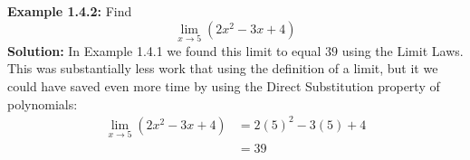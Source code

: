 \documentclass{article}
\begin{document}
	\textbf{Example 1.4.2:} Find
	$$\lim_{x \to 5}{(2x^2 - 3x + 4)}$$
	\textbf{Solution:} In Example 1.4.1 we found this limit to equal $39$ using the Limit Laws. This was substantially less work that using the definition of a limit, but it we could have saved even more time by using the Direct Substitution property of polynomials:
	\begin{align*}
		\lim_{x \to 5}{(2x^2 - 3x + 4)} &= 2(5)^2 - 3(5) + 4 \tag{Thrm 1.4.8}\\
		                                &= 39
	\end{align*}
\end{document}

